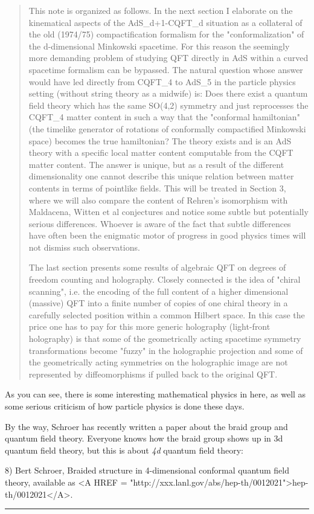 \begin{quote}
      This note is organized as follows.  In the next section I elaborate
      on the kinematical aspects of the AdS_{d+1}-CQFT_{d} 
      situation as a 
      collateral of the old (1974/75) compactification formalism for the 
     "conformalization" of the d-dimensional Minkowski spacetime.    
      For
      this reason the seemingly more demanding problem of studying QFT
      directly in AdS within a curved spacetime formalism can be bypassed.
      The natural question whose answer would have led directly from 
      CQFT_{4} to AdS_{5} in the particle physics setting (without string
      theory as a midwife) is: Does there exist a quantum field theory
      which has the same SO(4,2) symmetry and just reprocesses the 
      CQFT_{4}
      matter content in such a way that the "conformal hamiltonian"
      (the timelike generator of rotations of conformally compactified
      Minkowski space) becomes the true hamiltonian?  The theory 
      exists and is an AdS theory with a specific local matter content 
      computable from the CQFT matter content.  The answer is unique,
      but as a result of the different dimensionality one cannot describe
      this unique relation between matter contents in terms of pointlike
      fields.  This will be treated in Section 3, where we will also
      compare the content of Rehren's isomorphism with Maldacena, Witten
      et al conjectures and notice some subtle but potentially serious
      differences.  Whoever is aware of the fact that subtle differences
      have often been the enigmatic motor of progress in good physics
      times will not dismiss such observations.

      The last section presents some results of algebraic QFT on degrees
      of freedom counting and holography.  Closely connected is the idea
      of "chiral scanning", i.e. the encoding of the full content of
      a higher dimensional (massive) QFT into a finite number of copies
      of one chiral theory in a carefully selected position within a 
      common Hilbert space.  In this case the price one has to pay for 
      this more generic holography (light-front holography) is that some
      of the geometrically acting spacetime symmetry transformations 
      become "fuzzy" in the holographic projection and some of the 
      geometrically acting symmetries on the holographic image are not 
      represented by diffeomorphisms if pulled back to the original QFT.
\end{quote}
As you can see, there is some interesting mathematical physics in here, 
as well as some serious criticism of how particle physics is done these 
days.  

By the way, Schroer has recently written a paper about the braid group 
and quantum field theory.  Everyone knows how the braid group shows
up in 3d quantum field theory, but this is about \emph{4d} 
quantum field theory:

8) Bert Schroer, Braided structure in 4-dimensional conformal quantum
field theory, available as <A HREF =
"http://xxx.lanl.gov/abs/hep-th/0012021">hep-th/0012021</A>.


 \par\noindent\rule{\textwidth}{0.4pt}

